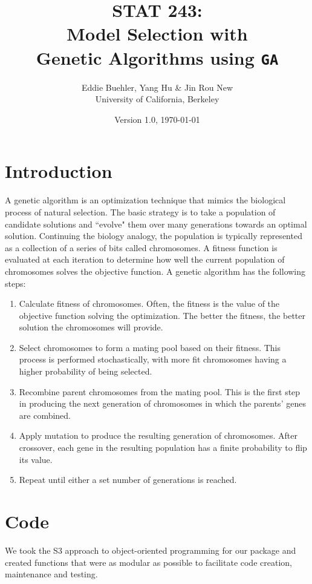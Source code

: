 \documentclass[11pt]{article}
\title{STAT 243: \\
	Model Selection with\\ 
	Genetic Algorithms using \texttt{GA}}
\author{Eddie Buehler, Yang Hu \& Jin Rou New\\
	University of California, Berkeley}
\date{Version 1.0, \today}
\begin{document}
\maketitle

\section{Introduction}
\label{sec:introduction}
A genetic algorithm is an optimization technique that mimics the
biological process of natural selection. The basic strategy is to take
a population of candidate solutions and ``evolve" them over many generations towards an
optimal solution. Continuing the biology analogy, the
population is typically represented as a collection of a series of bits called chromosomes. A fitness function is evaluated at each iteration to
determine how well the current population of chromosomes solves the objective
function. A genetic algorithm has the following steps: 
\begin{enumerate}
	\item Calculate fitness of chromosomes. Often, the
          fitness is the value of the objective function solving the
          optimization. The better the fitness, the better solution
          the chromosomes will provide.
	\item Select chromosomes to form a mating pool based on their
          fitness. This process is performed stochastically, with more
          fit chromosomes having a higher probability of being
          selected. 
	\item Recombine parent chromosomes from the mating pool. This
          is the first step in producing the next generation of
          chromosomes in which the parents' genes are combined.
	\item Apply mutation to produce the resulting generation of
          chromosomes. After crossover, each gene in the resulting
          population has a finite probability to flip its value.
    \item Repeat until either a set number of generations is reached.
\end{enumerate}

\section{Code}
\label{sec:code}
We took the S3 approach to object-oriented programming for our package and created functions that were as modular as possible to facilitate code creation, maintenance and testing.
\end{document}
